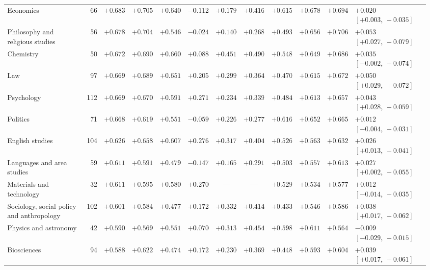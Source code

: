 \documentclass[11pt]{article}
\begin{document}
{\begin{longtable}{@{}>{\raggedright\arraybackslash}p{2.5cm}rcccccccccl@{}}
Economics & 66 & ${+}0.683$ & ${+}0.705$ & ${+}0.640$ & ${-}0.112$ & ${+}0.179$ & ${+}0.416$ & ${+}0.615$ & ${+}0.678$ & ${+}0.694$ & ${+}0.020$ $[{+}0.003,\,{+}0.035]$ \\
Philosophy and religious studies & 56 & ${+}0.678$ & ${+}0.704$ & ${+}0.546$ & ${-}0.024$ & ${+}0.140$ & ${+}0.268$ & ${+}0.493$ & ${+}0.656$ & ${+}0.706$ & ${+}0.053$ $[{+}0.027,\,{+}0.079]$ \\
Chemistry & 50 & ${+}0.672$ & ${+}0.690$ & ${+}0.660$ & ${+}0.088$ & ${+}0.451$ & ${+}0.490$ & ${+}0.548$ & ${+}0.649$ & ${+}0.686$ & ${+}0.035$ $[{-}0.002,\,{+}0.074]$ \\
Law & 97 & ${+}0.669$ & ${+}0.689$ & ${+}0.651$ & ${+}0.205$ & ${+}0.299$ & ${+}0.364$ & ${+}0.470$ & ${+}0.615$ & ${+}0.672$ & ${+}0.050$ $[{+}0.029,\,{+}0.072]$ \\
Psychology & 112 & ${+}0.669$ & ${+}0.670$ & ${+}0.591$ & ${+}0.271$ & ${+}0.234$ & ${+}0.339$ & ${+}0.484$ & ${+}0.613$ & ${+}0.657$ & ${+}0.043$ $[{+}0.028,\,{+}0.059]$ \\
Politics & 71 & ${+}0.668$ & ${+}0.619$ & ${+}0.551$ & ${-}0.059$ & ${+}0.226$ & ${+}0.277$ & ${+}0.616$ & ${+}0.652$ & ${+}0.665$ & ${+}0.012$ $[{-}0.004,\,{+}0.031]$ \\
English studies & 104 & ${+}0.626$ & ${+}0.658$ & ${+}0.607$ & ${+}0.276$ & ${+}0.317$ & ${+}0.404$ & ${+}0.526$ & ${+}0.563$ & ${+}0.632$ & ${+}0.026$ $[{+}0.013,\,{+}0.041]$ \\
Languages and area studies & 59 & ${+}0.611$ & ${+}0.591$ & ${+}0.479$ & ${-}0.147$ & ${+}0.165$ & ${+}0.291$ & ${+}0.503$ & ${+}0.557$ & ${+}0.613$ & ${+}0.027$ $[{+}0.002,\,{+}0.055]$ \\
Materials and technology & 32 & ${+}0.611$ & ${+}0.595$ & ${+}0.580$ & ${+}0.270$ & --- & --- & ${+}0.529$ & ${+}0.534$ & ${+}0.577$ & ${+}0.012$ $[{-}0.014,\,{+}0.035]$ \\
Sociology, social policy and anthropology & 102 & ${+}0.601$ & ${+}0.584$ & ${+}0.477$ & ${+}0.172$ & ${+}0.332$ & ${+}0.414$ & ${+}0.433$ & ${+}0.546$ & ${+}0.586$ & ${+}0.038$ $[{+}0.017,\,{+}0.062]$ \\
Physics and astronomy & 42 & ${+}0.590$ & ${+}0.569$ & ${+}0.551$ & ${+}0.070$ & ${+}0.313$ & ${+}0.454$ & ${+}0.598$ & ${+}0.611$ & ${+}0.564$ & ${-}0.009$ $[{-}0.029,\,{+}0.015]$ \\
Biosciences & 94 & ${+}0.588$ & ${+}0.622$ & ${+}0.474$ & ${+}0.172$ & ${+}0.230$ & ${+}0.369$ & ${+}0.448$ & ${+}0.593$ & ${+}0.604$ & ${+}0.039$ $[{+}0.017,\,{+}0.061]$ \\

\end{longtable}}
\end{document}
